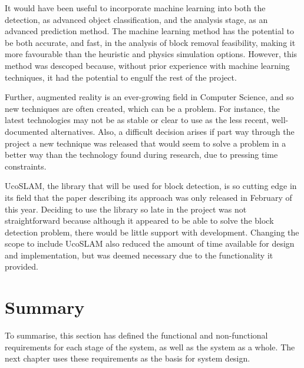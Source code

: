 It would have been useful to incorporate machine learning into both the detection, as advanced object classification, and the analysis stage, as an advanced prediction method. The machine learning method has the potential to be both accurate, and fast, in the analysis of block removal feasibility, making it more favourable than the heuristic and physics simulation options. However, this method was descoped because, without prior experience with machine learning techniques, it had the potential to engulf the rest of the project.

Further, augmented reality is an ever-growing field in Computer Science, and so new techniques are often created, which can be a problem. For instance, the latest technologies may not be as stable or clear to use as the less recent, well-documented alternatives. Also, a difficult decision arises if part way through the project a new technique was released that would seem to solve a problem in a better way than the technology found during research, due to pressing time constraints.

UcoSLAM, the library that will be used for block detection, is so cutting edge in its field that the paper describing its approach was only released in February of this year. Deciding to use the library so late in the project was not straightforward because although it appeared to be able to solve the block detection problem, there would be little support with development. Changing the scope to include UcoSLAM also reduced the amount of time available for design and implementation, but was deemed necessary due to the functionality it provided.

\section{Summary}

To summarise, this section has defined the functional and non-functional requirements for each stage of the system, as well as the system as a whole. The next chapter uses these requirements as the basis for system design.